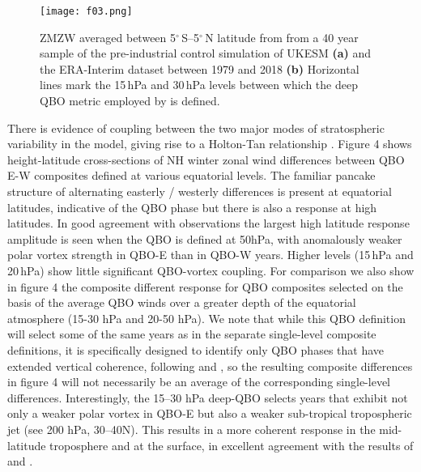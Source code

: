 \documentclass[wcd, manuscript]{copernicus}
\begin{document}

\begin{center}
\begin{figure}[h!]
\noindent\texttt{[image: f03.png]}
\caption{ZMZW averaged between 5$^{\circ}$\,S--5$^{\circ}$\,N latitude from from a 40 year sample of the pre-industrial control simulation of UKESM \textbf{(a)} and the ERA-Interim dataset between 1979 and 2018 \textbf{(b)} Horizontal lines mark the 15\,hPa and 30\,hPa levels between which the deep QBO metric employed by \cite{Andrews2019} is defined.}
\label{fig1}
\end{figure}
\end{center}




There is evidence of coupling between the two major modes of stratospheric variability in the model, giving rise to a Holton-Tan relationship \citep{Anstey20}. Figure 4 shows height-latitude cross-sections of NH winter zonal wind differences between QBO E-W composites defined at various equatorial levels. The familiar pancake structure of alternating easterly / westerly differences is present at equatorial latitudes, indicative of the QBO phase but there is also a response at high latitudes. In good agreement with observations the largest high latitude response amplitude is seen when  the QBO is defined at 50hPa, with anomalously weaker polar vortex strength in QBO-E than in QBO-W years. Higher levels (15\,hPa and 20\,hPa) show little significant QBO-vortex coupling. For comparison we also show in figure 4 the composite different response for QBO composites selected on the basis of the average QBO winds over a greater depth of the equatorial atmosphere (15-30 hPa and 20-50 hPa). We note that while this QBO definition will select some of the same years as in the separate single-level composite definitions, it is specifically designed to identify only QBO  phases that have extended vertical coherence, following \citep{Gray2018} and \cite{Andrews2019}, so the resulting composite  differences in figure 4 will not necessarily be an average of the corresponding single-level differences.   Interestingly, the 15--30 hPa deep-QBO selects years that exhibit not only a weaker polar vortex in QBO-E but also a weaker sub-tropical tropospheric jet (see 200 hPa, 30--40N). This results in a more coherent response in the mid-latitude troposphere and at the surface, in excellent agreement with the results of \cite{Gray2018} and \cite{Andrews2019}. 
\end{document}
